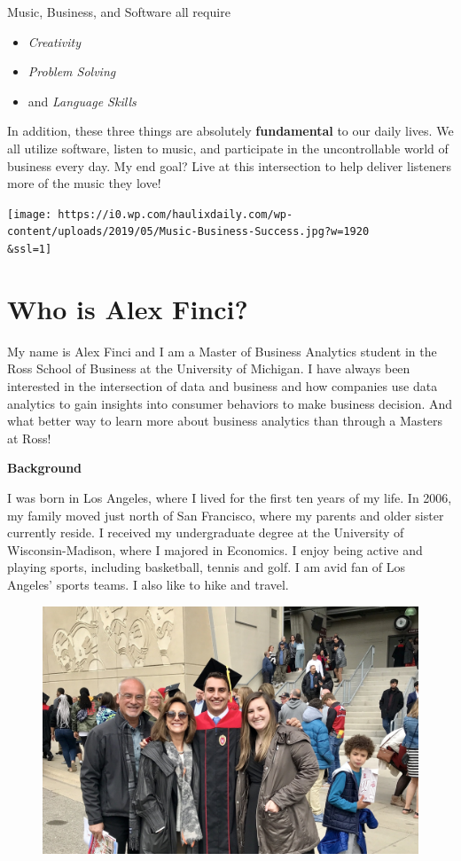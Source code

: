\documentclass[
]{book}
\providecommand{\tightlist}{%
  \setlength{\itemsep}{0pt}\setlength{\parskip}{0pt}}
\begin{document}
Music, Business, and Software all require

\begin{itemize}
\tightlist
\item
  \emph{Creativity}
\item
  \emph{Problem Solving}
\item
  and \emph{Language Skills}
\end{itemize}

In addition, these three things are absolutely \textbf{fundamental} to our daily lives. We all utilize software, listen to music, and participate in the uncontrollable world of business every day. My end goal? Live at this intersection to help deliver listeners more of the music they love!

\texttt{[image: https://i0.wp.com/haulixdaily.com/wp-content/uploads/2019/05/Music-Business-Success.jpg?w=1920\\\&ssl=1]}

\hypertarget{who-is-alex-finci}{%
\section{Who is Alex Finci?}\label{who-is-alex-finci}}

My name is Alex Finci and I am a Master of Business Analytics student in the Ross School of Business at the University of Michigan. I have always been interested in the intersection of data and business and how companies use data analytics to gain insights into consumer behaviors to make business decision. And what better way to learn more about business analytics than through a Masters at Ross!

\textbf{Background}

I was born in Los Angeles, where I lived for the first ten years of my life. In 2006, my family moved just north of San Francisco, where my parents and older sister currently reside. I received my undergraduate degree at the University of Wisconsin-Madison, where I majored in Economics. I enjoy being active and playing sports, including basketball, tennis and golf. I am avid fan of Los Angeles' sports teams. I also like to hike and travel.

\begin{figure}

{\centering \includegraphics[width=0.8\linewidth]{IMG_4355} 

}

\end{figure}
\end{document}
